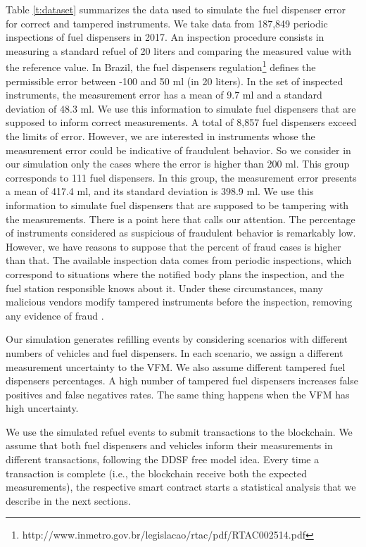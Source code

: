 \documentclass[sigplan]{acmart}
\begin{document}
Table \ref{t:dataset} summarizes the data used to simulate the fuel dispenser error for correct and tampered instruments.
We take data from 187,849 periodic inspections of fuel dispensers in 2017.
An inspection procedure consists in measuring a standard refuel of 20 liters and comparing the measured value with the reference value.
In Brazil, the fuel dispensers regulation\footnote{http://www.inmetro.gov.br/legislacao/rtac/pdf/RTAC002514.pdf} defines the permissible error between -100 and 50 ml (in 20 liters).
In the set of inspected instruments, the measurement error has a mean of 9.7 ml and a standard deviation of 48.3 ml.
We use this information to simulate fuel dispensers that are supposed to inform correct measurements.
A total of 8,857 fuel dispensers exceed the limits of error.
However, we are interested in instruments whose the measurement error could be indicative of fraudulent behavior.
So we consider in our simulation only the cases where the error is higher than 200 ml.
This group corresponds to 111 fuel dispensers.
In this group, the measurement error presents a mean of 417.4 ml, and its standard deviation is 398.9 ml.
We use this information to simulate fuel dispensers that are supposed to be tampering with the measurements.
There is a point here that calls our attention.
The percentage of instruments considered as suspicious of fraudulent behavior is remarkably low.
However, we have reasons to suppose that the percent of fraud cases is higher than that.
The available inspection data comes from periodic inspections, which correspond to situations where the notified body plans the inspection, and the fuel station responsible knows about it.
Under these circumstances, many malicious vendors modify tampered instruments before the inspection, removing any evidence of fraud \cite{Leitao2014a,Beteto2016}.

Our simulation generates refilling events by considering scenarios with different numbers of vehicles and fuel dispensers.
In each scenario, we assign a different measurement uncertainty to the VFM.
We also assume different tampered fuel dispensers percentages.
A high number of tampered fuel dispensers increases false positives and false negatives rates.
The same thing happens when the VFM has high uncertainty.

We use the simulated refuel events to submit transactions to the blockchain.
We assume that both fuel dispensers and vehicles inform their measurements in different transactions, following the DDSF free model idea.
Every time a transaction is complete (i.e., the blockchain receive both the expected measurements), the respective smart contract starts a statistical analysis that we describe in the next sections.
\end{document}
